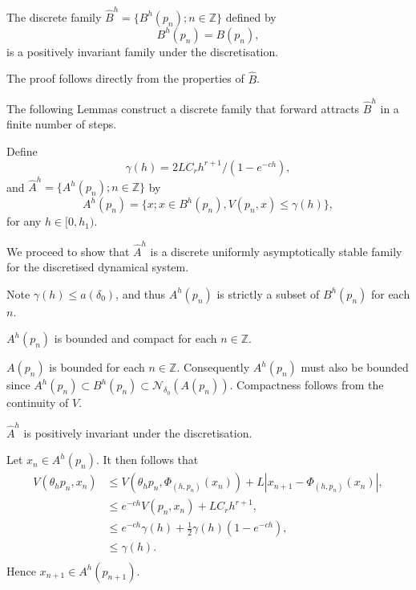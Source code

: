 \begin{lemma}[B2]
The discrete family $\hat{B}^{h} = \{ B^h(p_n);  n \in \mathbb{Z}  \}$ defined by
\[ B^h(p_n) = B(p_n), \]
is a positively invariant family under the discretisation.
\end{lemma}
\begin{prf}
  The proof follows directly from the properties of $\hat{B}$.
\end{prf}

The following Lemmas construct a discrete family that forward attracts
$\hat{B}^{h}$ in a finite number of steps.

\begin{defn}[A1]
Define
\[ \gamma(h) = 2LC_rh^{r+1}/(1 - e^{-ch}), \]
and $\hat{A}^h = \{ A^h(p_n); n \in \mathbb{Z} \}$ by
\begin{equation}\label{eqAdefn}
  A^h(p_n) = \{ x ; x \in B^h(p_n), V(p_n, x) \leq \gamma(h) \},
\end{equation}
 for any $h \in [0,h_1)$.
\end{defn}

We proceed to show that $\hat{A}^h$ is a discrete uniformly
asymptotically stable family for the discretised dynamical system.

Note $\gamma(h) \leq a(\delta_0)$, and thus $A^h(p_n)$ is strictly a subset
of $B^h(p_n)$ for each $n$.

\begin{lemma}[A2]
$A^h(p_n)$ is bounded and compact for each $n \in \mathbb{Z}$.
\end{lemma}
\begin{prf}
$A(p_n)$ is bounded for each $n \in \mathbb{Z}$. Consequently $A^h(p_n) $ must
also be bounded since $A^h(p_n) \subset B^h(p_n) \subset
\mathcal{N}_{\delta_0}(A(p_n))$.
Compactness follows from the continuity of $V$.
\end{prf}

\begin{lemma}[A3]
$\hat{A}^h$ is positively invariant under the discretisation.
\end{lemma}
\begin{prf}
Let $x_n \in A^h(p_n)$. It then follows
that \begin{align*}
  V( \theta_hp_n, x_n) &\leq V( \theta_hp_n, \Phi_{(h, p_n)}(x_n) ) + L|x_{n+1}
          - \Phi_{(h, p_n)}(x_n)|, \\
  &\leq e^{-ch} V( p_n, x_n) + LC_rh^{r+1}, \\
  &\leq e^{-ch} \gamma(h) + \frac{1}{2} \gamma(h) (1 - e^{-ch}), \\
  &\leq \gamma (h). \\
\end{align*}
Hence $x_{n+1} \in A^h(p_{n+1})$.
\end{prf}

